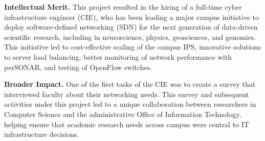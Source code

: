 {\bf Intellectual Merit.} This project resulted in the hiring of a
full-time cyber infrastructure engineer (CIE), who has been leading a
major campus initiative to deploy software-defined networking (SDN)
for the next generation of data-driven scientific research, including
in neuroscience, physics, geosciences, and genomics. This initiative
led to cost-effective scaling of the campus IPS, innovative solutions
to server load balancing, better monitoring of network performance
with perSONAR, and testing of OpenFlow switches.

{\bf Broader Impact.} One of the first tasks of the CIE was to create
a survey that interviewed faculty about their networking needs. This
survey and subsequent activities under this project led to a unique
collaboration between researchers in Computer Science and the
administrative Office of Information Technology, helping ensure that
academic research needs across campus were central to IT
infrastructure decisions.

